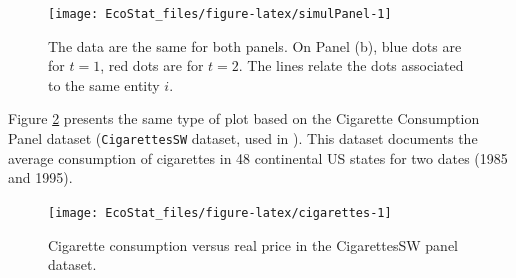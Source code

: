 \documentclass[
  12pt,
]{book}
\theoremstyle{definition}
\theoremstyle{definition}
\theoremstyle{definition}
\theoremstyle{definition}
\theoremstyle{remark}
\begin{document}
\begin{figure}
\texttt{[image: EcoStat\_files/figure-latex/simulPanel-1]} \caption{The data are the same for both panels. On Panel (b), blue dots are for $t=1$, red dots are for $t=2$. The lines relate the dots associated to the same entity $i$.}\label{fig:simulPanel}
\end{figure}

Figure \ref{fig:cigarettes} presents the same type of plot based on the Cigarette Consumption Panel dataset (\texttt{CigarettesSW} dataset, used in \citet{Stock_Watson_2003}). This dataset documents the average consumption of cigarettes in 48 continental US states for two dates (1985 and 1995).

\begin{figure}
\texttt{[image: EcoStat\_files/figure-latex/cigarettes-1]} \caption{Cigarette consumption versus real price in the CigarettesSW panel dataset.}\label{fig:cigarettes}
\end{figure}
\end{document}
